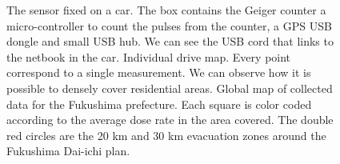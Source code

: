\documentclass[11pt]{article}
\begin{document}
\begin{figure}[ht]
\centering
{}
  \caption[The Figure]{ 
             The sensor fixed on a car. The box contains the
            Geiger counter a micro-controller to count the pulses from the
            counter, a GPS USB dongle and small USB hub. We can see the USB
            cord that links to the netbook in the car.  
             Individual drive map. Every point correspond to a
            single measurement. We can observe how it is possible to densely
            cover residential areas.
             Global map of collected data for the Fukushima
            prefecture.  Each square is color coded according to the average
            dose rate in the area covered. The double red circles are the 20 km
            and 30 km evacuation zones around the Fukushima Dai-ichi plan.
  }
\label{fig:thefigure}
\end{figure}

\end{document}
